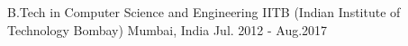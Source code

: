 

\begin{cventries}

  \cvedu
    {B.Tech in Computer Science and Engineering} %
    {IITB (Indian Institute of Technology Bombay)} %
    {Mumbai, India} %
    {Jul. 2012 -  Aug.2017} %
  

\end{cventries}
